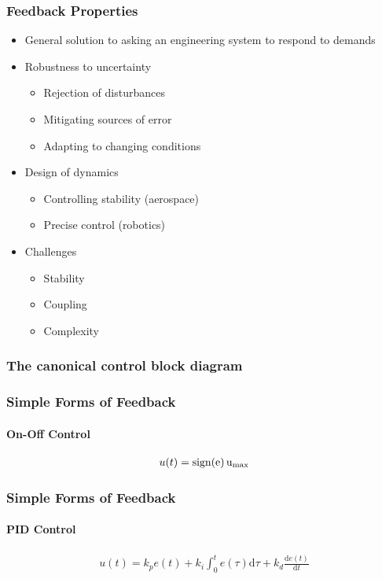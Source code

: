 \documentclass{beamer-control}
\begin{document}
\begin{frame}
\frametitle{Feedback Properties }
\begin{itemize}
\item<only@1> General solution to asking an engineering system to respond to demands
\item<only@2> Robustness to uncertainty
\begin{itemize}
\item Rejection of disturbances
\item Mitigating sources of error
\item Adapting to changing conditions
\end{itemize}
\item<only@3> Design of dynamics
\begin{itemize}
\item Controlling stability (aerospace)
\item Precise control (robotics)
\end{itemize}
\item<only@4> Challenges
\begin{itemize}
\item Stability
\item Coupling
\item Complexity
\end{itemize}
\end{itemize}
\end{frame}


\begin{frame}
\frametitle{The canonical control block diagram}

\end{frame}


\begin{frame}
\frametitle{Simple Forms of Feedback }
\framesubtitle{On-Off Control}
\begin{gather}
u(t) = \operatorfont{sign}(e)\, u_{\mathrm{max}}
\end{gather}
\end{frame}

\begin{frame}
\frametitle{Simple Forms of Feedback }
\framesubtitle{PID Control}
\vfil
\begin{gather}
u(t) = k_p e(t) + k_i \int_0^t e(\tau) \mathrm d\tau + k_d \frac{\mathrm d e(t)}{\mathrm d t}
\end{gather}
\end{frame}
\end{document}
